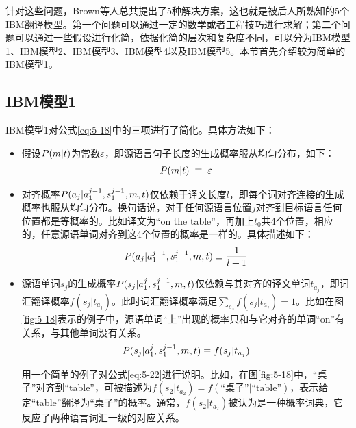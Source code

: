 针对这些问题，Brown等人总共提出了5种解决方案，这也就是被后人所熟知的5个IBM翻译模型。第一个问题可以通过一定的数学或者工程技巧进行求解；第二个问题可以通过一些假设进行化简，依据化简的层次和复杂度不同，可以分为IBM模型1、IBM模型2、IBM模型3、IBM模型4以及IBM模型5。本节首先介绍较为简单的IBM模型1。

\vspace{-0.5em}
\subsection{IBM模型1}
\parinterval IBM模型1对公式\eqref{eq:5-18}中的三项进行了简化。具体方法如下：

\begin{itemize}
\item 假设${P}(m|{t})$为常数$\varepsilon$，即源语言句子长度的生成概率服从均匀分布，如下：
\begin{eqnarray}
{P}(m|{t})\; \equiv \; \varepsilon
\label{eq:5-20}
\end{eqnarray}
\item 对齐概率${P}(a_j|a_1^{j-1},s_1^{j-1},m,{t})$仅依赖于译文长度$l$，即每个词对齐连接的生成概率也服从均匀分布。换句话说，对于任何源语言位置$j$对齐到目标语言任何位置都是等概率的。比如译文为“on the table”，再加上$t_0$共4个位置，相应的，任意源语单词对齐到这4个位置的概率是一样的。具体描述如下：
\begin{eqnarray}
{P}(a_j|a_1^{j-1},s_1^{j-1},m,{t}) \equiv \frac{1}{l+1}
\label{eq:5-21}
\end{eqnarray}

\item 源语单词$s_j$的生成概率${P}(s_j|a_1^{j},s_1^{j-1},m,{t})$仅依赖与其对齐的译文单词$t_{a_j}$，即词汇翻译概率$f(s_j|t_{a_j})$。此时词汇翻译概率满足$\sum_{s_j}{f(s_j|t_{a_j})}=1$。比如在图\ref{fig:5-18}表示的例子中，源语单词“上”出现的概率只和与它对齐的单词“on”有关系，与其他单词没有关系。
\begin{eqnarray}
{P}(s_j|a_1^{j},s_1^{j-1},m,{t}) \equiv f(s_j|t_{a_j})
\label{eq:5-22}
\end{eqnarray}

用一个简单的例子对公式\eqref{eq:5-22}进行说明。比如，在图\ref{fig:5-18}中，“桌子”对齐到“table”，可被描述为$f(s_2 |t_{a_2})=f(\textrm{“桌子”}|\textrm{“table”})$，表示给定“table”翻译为“桌子”的概率。通常，$f(s_2 |t_{a_2})$被认为是一种概率词典，它反应了两种语言词汇一级的对应关系。
\end{itemize}

